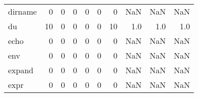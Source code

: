 \begin{tabular}{lrrrrrrrrr}
dirname   &                                                  0 &                                                  0 &                                                  0 &                                                  0 &                                                  0 &                                                  0 &                                                NaN &                                    NaN &                                  NaN \\
du        &                                                 10 &                                                  0 &                                                  0 &                                                  0 &                                                  0 &                                                 10 &                                                1.0 &                                    1.0 &                                  1.0 \\
echo      &                                                  0 &                                                  0 &                                                  0 &                                                  0 &                                                  0 &                                                  0 &                                                NaN &                                    NaN &                                  NaN \\
env       &                                                  0 &                                                  0 &                                                  0 &                                                  0 &                                                  0 &                                                  0 &                                                NaN &                                    NaN &                                  NaN \\
expand    &                                                  0 &                                                  0 &                                                  0 &                                                  0 &                                                  0 &                                                  0 &                                                NaN &                                    NaN &                                  NaN \\
expr      &                                                  0 &                                                  0 &                                                  0 &                                                  0 &                                                  0 &                                                  0 &                                                NaN &                                    NaN &                                  NaN \\

\end{tabular}
